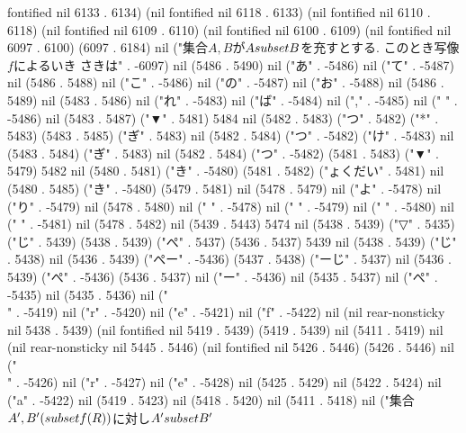 fontified nil 6133 . 6134) (nil fontified nil 6118 . 6133) (nil fontified nil 6110 . 6118) (nil fontified nil 6109 . 6110) (nil fontified nil 6100 . 6109) (nil fontified nil 6097 . 6100) (6097 . 6184) nil ("集合$A, B$が$A\\subset B$を充すとする. このとき写像$f$によるいき
   さきは" . -6097) nil (5486 . 5490) nil ("あ" . -5486) nil ("て" . -5487) nil (5486 . 5488) nil ("こ" . -5486) nil ("の" . -5487) nil ("お" . -5488) nil (5486 . 5489) nil (5483 . 5486) nil ("れ" . -5483) nil ("ば" . -5484) nil ("," . -5485) nil (" " . -5486) nil (5483 . 5487) ("▼" . 5481) 5484 nil (5482 . 5483) ("つ" . 5482) ("*" . 5483) (5483 . 5485) ("ぎ" . 5483) nil (5482 . 5484) ("つ" . -5482) ("け" . -5483) nil (5483 . 5484) ("ぎ" . 5483) nil (5482 . 5484) ("つ" . -5482) (5481 . 5483) ("▼" . 5479) 5482 nil (5480 . 5481) ("き" . -5480) (5481 . 5482) ("ょくだい" . 5481) nil (5480 . 5485) ("き" . -5480) (5479 . 5481) nil (5478 . 5479) nil ("よ" . -5478) nil ("り" . -5479) nil (5478 . 5480) nil ("
" . -5478) nil (" " . -5479) nil (" " . -5480) nil (" " . -5481) nil (5478 . 5482) nil (5439 . 5443) 5474 nil (5438 . 5439) ("▽" . 5435) ("じ" . 5439) (5438 . 5439) ("ぺ" . 5437) (5436 . 5437) 5439 nil (5438 . 5439) ("じ" . 5438) nil (5436 . 5439) ("ぺー" . -5436) (5437 . 5438) ("ーじ" . 5437) nil (5436 . 5439) ("ぺ" . -5436) (5436 . 5437) nil ("ー" . -5436) nil (5435 . 5437) nil ("ぺ" . -5435) nil (5435 . 5436) nil ("\\" . -5419) nil ("r" . -5420) nil ("e" . -5421) nil ("f" . -5422) nil (nil rear-nonsticky nil 5438 . 5439) (nil fontified nil 5419 . 5439) (5419 . 5439) nil (5411 . 5419) nil (nil rear-nonsticky nil 5445 . 5446) (nil fontified nil 5426 . 5446) (5426 . 5446) nil ("\\" . -5426) nil ("r" . -5427) nil ("e" . -5428) nil (5425 . 5429) nil (5422 . 5424) nil ("a" . -5422) nil (5419 . 5423) nil (5418 . 5420) nil (5411 . 5418) nil ("集合$A', B'(\\subset f(R))$に対し$A'\\subset B'$
